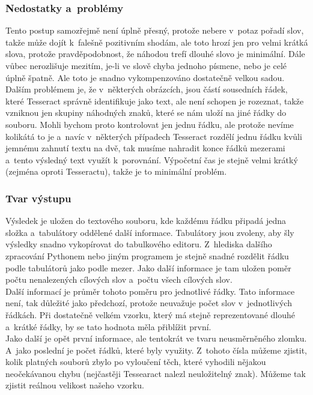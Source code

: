 \documentclass[12pt,oneside]{report}			%
\begin{document}
	 \subsubsection{Nedostatky a~problémy}
	Tento postup samozřejmě není úplně přesný, protože nebere v~potaz pořadí slov, takže může dojít k~falešně pozitivním shodám, ale toto hrozí jen pro velmi krátká slova, protože pravděpodobnost, že náhodou trefí  dlouhé slovo je minimální. Dále vůbec nerozlišuje mezitím, je-li ve slově chyba jednoho písmene, nebo je celé úplně špatně. Ale toto je snadno vykompenzováno dostatečně velkou sadou.\\	
	Dalším problémem je, že v~některých obrázcích, jsou částí sousedních řádek, které Tesseract správně identifikuje jako text, ale není schopen je rozeznat, takže vzniknou jen skupiny náhodných znaků, které se nám uloží na jiné řádky do souboru. Mohli bychom proto kontrolovat jen jednu řádku, ale protože nevíme kolikátá to je a~navíc v~některých případech Tesseract rozdělí jednu řádku kvůli jemnému zahnutí textu na dvě, tak musíme nahradit konce řádků mezerami a~tento výsledný text využít k~porovnání. Výpočetní čas je stejně velmi krátký (zejména oproti Tesseractu), takže je to minimální problém.\\
	\subsubsection{Tvar výstupu}
	Výsledek je uložen do textového souboru, kde každému řádku připadá jedna složka a~tabulátory oddělené další informace. Tabulátory jsou zvoleny, aby šly výsledky snadno vykopírovat do tabulkového editoru. Z~hlediska dalšího zpracování Pythonem nebo jiným programem je stejně snadné rozdělit řádku podle tabulátorů jako podle mezer. Jako další informace je tam uložen poměr počtu nenalezených cílových slov a~počtu všech cílových slov. \\Další informací je průměr tohoto poměru pro jednotlivé řádky. Tato informace není, tak důležité jako předchozí, protože neuvažuje  počet slov v~jednotlivých řádkách. Při dostatečně velkém vzorku, který má stejně reprezentované dlouhé a~krátké řádky, by se tato hodnota měla přiblížit první. \\Jako další je opět první informace, ale tentokrát ve tvaru neusměrněného zlomku. A~jako poslední je počet řádků, které byly využity. Z~tohoto čísla můžeme zjistit, kolik platných souborů zbylo po vyloučení těch, které vyhodili nějakou neočekávanou chybu (nejčastěji Tessearact nalezl neuložitelný znak). Můžeme tak zjistit reálnou velikost našeho vzorku.
\end{document}
